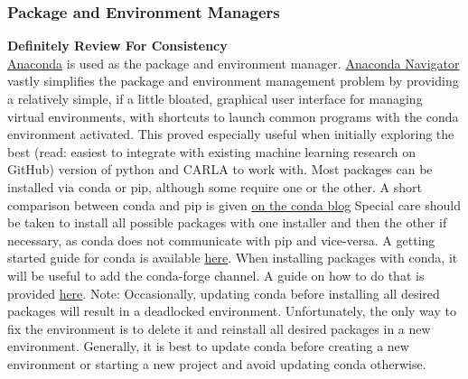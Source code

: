 \documentclass[12pt,oneside,letterpaper]{article}
\begin{document}
\subsubsection{Package and Environment Managers}
\label{subsec: Environment Managers}
\textbf{Definitely Review For Consistency}\\
\href{https://www.anaconda.com/}{Anaconda} is used as the package and environment manager. \href{https://www.anaconda.com/products/navigator}{Anaconda Navigator} vastly simplifies the package and environment management problem by providing a relatively simple, if a little bloated, graphical user interface for managing virtual environments, with shortcuts to launch common programs with the conda environment activated. This proved especially useful when initially exploring the best (read: easiest to integrate with existing machine learning research on GitHub) version of python and CARLA to work with. Most packages can be installed via conda or pip, although some require one or the other. A short comparison between conda and pip is given \href{https://www.anaconda.com/blog/understanding-conda-and-pip}{on the conda blog} Special care should be taken to install all possible packages with one installer and then the other if necessary, as conda does not communicate with pip and vice-versa. %
A getting started guide for conda is available \href{https://docs.conda.io/projects/conda/en/latest/user-guide/getting-started.html}{here}.
When installing packages with conda, it will be useful to add the conda-forge channel. A guide on how to do that is provided \href{https://docs.conda.io/projects/conda/en/latest/user-guide/concepts/channels.html}{here}.
Note: Occasionally, updating conda before installing all desired packages will result in a deadlocked environment. Unfortunately, the only way to fix the environment is to delete it and reinstall all desired packages in a new environment. Generally, it is best to update conda before creating a new environment or starting a new project and avoid updating conda otherwise.
\\
\end{document}
